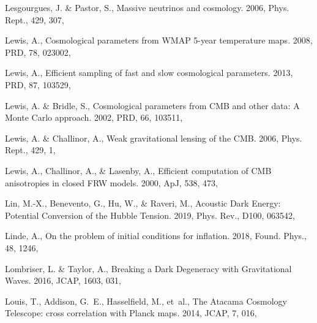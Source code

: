 \documentclass[longauth,traditabstract]{aa}
\def\apj{{ApJ}}
\def\prd{{PRD}}
\def\jcap{{JCAP}}
\begin{document}
\begin{thebibliography}{379}
Lesgourgues, J. \& Pastor, S., Massive neutrinos and cosmology. 2006, Phys.
  Rept., 429, 307, 

Lewis, A., {Cosmological parameters from WMAP 5-year temperature maps}. 2008,
  \prd, 78, 023002, 

Lewis, A., {Efficient sampling of fast and slow cosmological parameters}. 2013,
  \prd, 87, 103529, 

Lewis, A. \& Bridle, S., {Cosmological parameters from CMB and other data: A
  Monte Carlo approach}. 2002, \prd, 66, 103511, 

Lewis, A. \& Challinor, A., {Weak gravitational lensing of the CMB}. 2006,
  Phys. Rept., 429, 1, 

Lewis, A., Challinor, A., \& Lasenby, A., {Efficient computation of CMB
  anisotropies in closed FRW models}. 2000, \apj, 538, 473,

Lin, M.-X., Benevento, G., Hu, W., \& Raveri, M., {Acoustic Dark Energy:
  Potential Conversion of the Hubble Tension}. 2019, Phys. Rev., D100, 063542,

Linde, A., {On the problem of initial conditions for inflation}. 2018, Found.
  Phys., 48, 1246, 

Lombriser, L. \& Taylor, A., {Breaking a Dark Degeneracy with Gravitational
  Waves}. 2016, JCAP, 1603, 031, 

{Louis}, T., {Addison}, G.~E., {Hasselfield}, M., {et~al.}, {The Atacama
  Cosmology Telescope: cross correlation with Planck maps}. 2014, \jcap, 7,
  016, 


\end{thebibliography}
\end{document}

